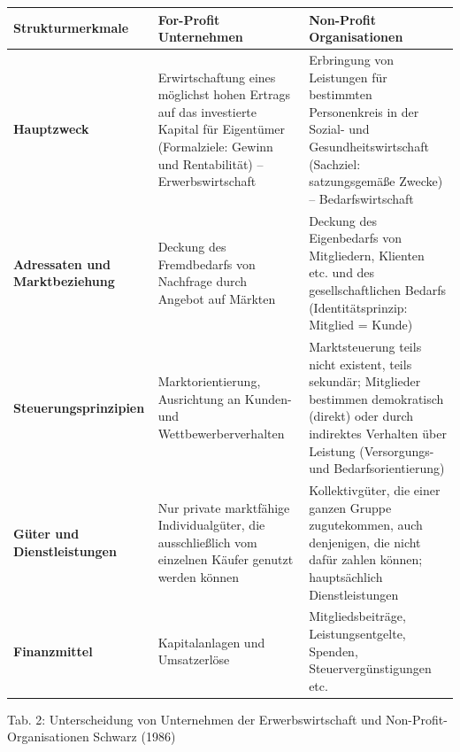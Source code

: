\documentclass[
  letterpaper,
]{book}
\begin{document}
\begin{longtable}[]{@{}
  >{\raggedright\arraybackslash}p{}
  >{\raggedright\arraybackslash}p{}
  >{\raggedright\arraybackslash}p{}@{}}
\toprule\noalign{}
\begin{minipage}[b]{\linewidth}\raggedright
\textbf{Strukturmerkmale}
\end{minipage} & \begin{minipage}[b]{\linewidth}\raggedright
\textbf{For-Profit Unternehmen}
\end{minipage} & \begin{minipage}[b]{\linewidth}\raggedright
\textbf{Non-Profit Organisationen}
\end{minipage} \\
\midrule\noalign{}
\endhead
\bottomrule\noalign{}
\endlastfoot
\textbf{Hauptzweck} & Erwirtschaftung eines möglichst hohen Ertrags auf
das investierte Kapital für Eigentümer (Formalziele: Gewinn und
Rentabilität) -- Erwerbswirtschaft & Erbringung von Leistungen für
bestimmten Personenkreis in der Sozial- und Gesundheitswirtschaft
(Sachziel: satzungsgemäße Zwecke) -- Bedarfswirtschaft \\
\textbf{Adressaten und Marktbeziehung} & Deckung des Fremdbedarfs von
Nachfrage durch Angebot auf Märkten & Deckung des Eigenbedarfs von
Mitgliedern, Klienten etc. und des gesellschaftlichen Bedarfs
(Identitätsprinzip: Mitglied = Kunde) \\
\textbf{Steuerungsprinzipien} & Marktorientierung, Ausrichtung an
Kunden- und Wettbewerberverhalten & Marktsteuerung teils nicht existent,
teils sekundär; Mitglieder bestimmen demokratisch (direkt) oder durch
indirektes Verhalten über Leistung (Versorgungs- und
Bedarfsorientierung) \\
\textbf{Güter und Dienstleistungen} & Nur private marktfähige
Individualgüter, die ausschließlich vom einzelnen Käufer genutzt werden
können & Kollektivgüter, die einer ganzen Gruppe zugutekommen, auch
denjenigen, die nicht dafür zahlen können; hauptsächlich
Dienstleistungen \\
\textbf{Finanzmittel} & Kapitalanlagen und Umsatzerlöse &
Mitgliedsbeiträge, Leistungsentgelte, Spenden, Steuervergünstigungen
etc. \\
\end{longtable}

Tab. 2: Unterscheidung von Unternehmen der Erwerbswirtschaft und
Non-Profit-Organisationen \label{table2}{Schwarz (1986)}
\end{document}
